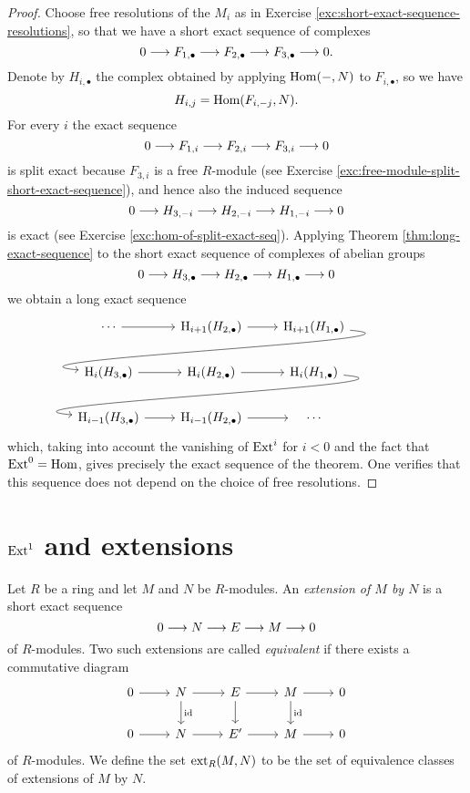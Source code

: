 \begin{proof}
Choose free resolutions of the $M_i$ as in Exercise \ref{exc:short-exact-sequence-resolutions}, so that we have a short exact sequence of complexes
\[
	 0 \longrightarrow F_{1,\bullet} \longrightarrow F_{2,\bullet} \longrightarrow F_{3,\bullet} \longrightarrow 0.
\]
Denote by $H_{i,\bullet}$ the complex obtained by applying $\operatorname{Hom}(-,N)$ to $F_{i,\bullet}$, so we have
\[
	H_{i,j} = \operatorname{Hom}(F_{i,-j}, N).
\]
For every $i$ the exact sequence
\[
	0 \longrightarrow F_{1,i} \longrightarrow F_{2,i} \longrightarrow F_{3,i} \longrightarrow 0
\]
is split exact because $F_{3,i}$ is a free $R$-module (see Exercise \ref{exc:free-module-split-short-exact-sequence}), and hence also the induced sequence
\[
	0 \longrightarrow H_{3,-i} \longrightarrow H_{2,-i} \longrightarrow
	H_{1,-i} \longrightarrow 0
\]
is exact (see Exercise \ref{exc:hom-of-split-exact-seq}). Applying Theorem \ref{thm:long-exact-sequence}
to the short exact sequence of complexes of abelian groups
\[
	0 \longrightarrow H_{3,\bullet} \longrightarrow H_{2,\bullet} \longrightarrow H_{1,\bullet} \longrightarrow 0
\]
 we obtain a long exact sequence
 \[
\mkern-72mu\begin{tikzcd}
		& \cdots \arrow{r}
		& \rH_{i+1}(H_{2,\bullet}) \arrow{r} 
		& \rH_{i+1}(H_{1,\bullet})  \arrow[out=-5, in=175]{dll} \\
	&\rH_{i}(H_{3,\bullet})  \arrow{r}
		& \rH_{i}(H_{2,\bullet}) \arrow{r} 
		& \rH_{i}(H_{1,\bullet})  \arrow[out=-5, in=175]{dll} \\
	& \rH_{i-1}(H_{3,\bullet}) \arrow{r}
		& \rH_{i-1}(H_{2,\bullet}) \arrow{r} 
		& \quad\cdots\quad
\end{tikzcd} 
\]
which, taking into account the vanishing of $\operatorname{Ext}^{i}$ for $i<0$ and the fact that $\operatorname{Ext}^0=\operatorname{Hom}$, gives precisely the 
exact sequence of the theorem. One verifies that this sequence does not depend on the choice of free resolutions.
\end{proof}

\section{$\operatorname{Ext}^1$ and  extensions}





\begin{definition}
Let $R$ be a ring and let $M$ and $N$ be $R$-modules. An \emph{extension of $M$ by $N$} is a short exact sequence
\[
	0 \longrightarrow N \longrightarrow E \longrightarrow M \longrightarrow 0
\]
of $R$-modules. Two such extensions are called \emph{equivalent} if there exists a commutative diagram
\[
\begin{tikzcd}
0 \arrow{r} & N \arrow{r} \arrow{d}{\id} & E \arrow{r} \arrow{d} & M \arrow{r} \arrow{d}{\id} & 0 \\
0  \arrow{r} & N \arrow {r} & E' \arrow{r} & M \arrow{r} & 0
\end{tikzcd}
\]
of $R$-modules. We define the set $\operatorname{ext}_R(M,N)$ to be the set of equivalence classes of extensions of $M$ by $N$.
\end{definition}

